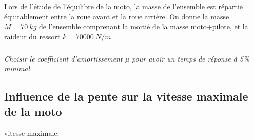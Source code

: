 \documentclass[10pt,fleqn]{article} %
\begin{document}
\begin{multicols}{2}
Lors de l’étude de l’équilibre de la moto, la masse de l’ensemble est répartie équitablement entre la roue avant et la roue arrière. On donne la masse $M=\SI{70}{kg}$ de l’ensemble comprenant la moitié de la masse moto+pilote, et
la raideur du ressort $k=\SI{70000}{N/m}$.

\subparagraph{}
\textit{Choisir le coefficient d’amortissement $\mu$ pour avoir un temps de réponse à 5\% minimal.}
\ifprof
\begin{corrige}
\end{corrige}
\else
\fi

%
%
%


\subsection*{Influence de la pente sur la vitesse maximale de la moto}

vitesse maximale.


\end{multicols}
\end{document}

